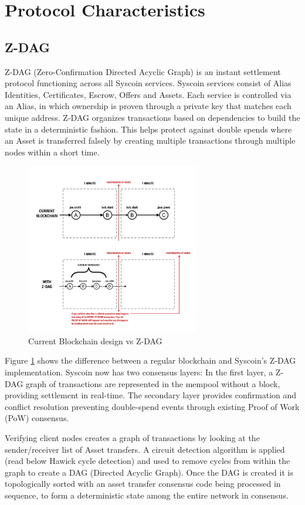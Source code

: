 \documentclass[peerreview]{ieeesyscoin}
\begin{document}
\section{Protocol Characteristics}
\label{sec:protocol}

\subsection{Z-DAG}
Z-DAG (Zero-Confirmation Directed Acyclic Graph) is an instant settlement protocol functioning across all Syscoin services. Syscoin services consist of Alias Identities, Certificates, Escrow, Offers and Assets.
Each service is controlled via an Alias, in which ownership is proven through a private key that matches each
unique address. Z-DAG organizes transactions based on dependencies to build the state in a deterministic fashion. This helps protect against double spends where an Asset is transferred falsely by creating multiple transactions through multiple nodes within a short time.

\begin{figure}[h!]
\includegraphics[width=3in]{img/current_vs_zdag.png}
\caption{Current Blockchain design vs Z-DAG} 
\label{fig:current_vs_zdag}
\end{figure} 

Figure \ref{fig:current_vs_zdag}  shows the difference between a regular blockchain and Syscoin’s Z-DAG implementation. Syscoin now has two consensus layers: In the first layer, a Z-DAG graph of transactions are represented in the mempool without a block, providing settlement in real-time. The secondary layer provides confirmation and conflict resolution preventing double-spend events through existing Proof of Work (PoW) consensus.

Verifying client nodes creates a graph of transactions by looking at the sender/receiver list of Asset transfers. A
circuit detection algorithm is applied (read below Hawick cycle detection) and used to remove cycles from within the graph to create a DAG (Directed Acyclic Graph). Once the DAG is created it is topologically sorted with an asset transfer consensus code being processed in sequence, to form a deterministic state among the entire network in consensus.
\end{document}
